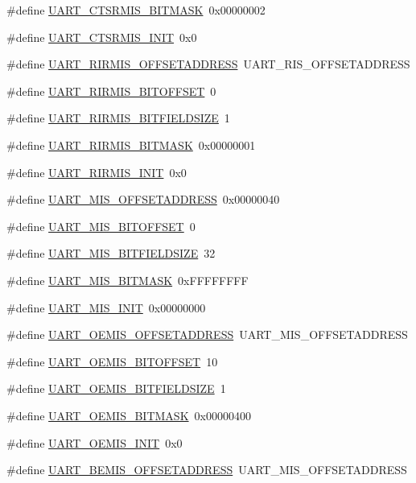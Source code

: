 \begin{DoxyCompactItemize}
\item 
\#define \hyperlink{a00575_a532a9a9b8c5334d87daa965c02495421}{UART\_\-CTSRMIS\_\-BITMASK}~0x00000002
\item 
\#define \hyperlink{a00575_acf809f477601ed3d7508458ef2de60fb}{UART\_\-CTSRMIS\_\-INIT}~0x0
\item 
\#define \hyperlink{a00575_a548ebc26f5fa42b536e65a2a01d9463d}{UART\_\-RIRMIS\_\-OFFSETADDRESS}~UART\_\-RIS\_\-OFFSETADDRESS
\item 
\#define \hyperlink{a00575_ac9c1d0ccde6ac054addb73f80c68958d}{UART\_\-RIRMIS\_\-BITOFFSET}~0
\item 
\#define \hyperlink{a00575_a3ecc630eb2fb9ac2a17c062d6edb2c39}{UART\_\-RIRMIS\_\-BITFIELDSIZE}~1
\item 
\#define \hyperlink{a00575_a7ee397a94f9a55592a64dfae9a60e793}{UART\_\-RIRMIS\_\-BITMASK}~0x00000001
\item 
\#define \hyperlink{a00575_a1df17599d2535f670e4687b68ee18aaa}{UART\_\-RIRMIS\_\-INIT}~0x0
\item 
\#define \hyperlink{a00575_a114f9a612f68d2d99e26642631dc2dd1}{UART\_\-MIS\_\-OFFSETADDRESS}~0x00000040
\item 
\#define \hyperlink{a00575_a87021cfe2ace821928fc6ecaf431a55d}{UART\_\-MIS\_\-BITOFFSET}~0
\item 
\#define \hyperlink{a00575_aa222440139eb174738c8e8db38defea6}{UART\_\-MIS\_\-BITFIELDSIZE}~32
\item 
\#define \hyperlink{a00575_ae59797bd011d4ecf8f938bc14643f8eb}{UART\_\-MIS\_\-BITMASK}~0xFFFFFFFF
\item 
\#define \hyperlink{a00575_aa8eebc2ba4a7f92119466ac11543b6ad}{UART\_\-MIS\_\-INIT}~0x00000000
\item 
\#define \hyperlink{a00575_a2537e9333bb58d4754b6789d260b9058}{UART\_\-OEMIS\_\-OFFSETADDRESS}~UART\_\-MIS\_\-OFFSETADDRESS
\item 
\#define \hyperlink{a00575_a868743cc2520e2ce9df53c3071cf894a}{UART\_\-OEMIS\_\-BITOFFSET}~10
\item 
\#define \hyperlink{a00575_a2fb4eea13b23d656e1e64aedc6049573}{UART\_\-OEMIS\_\-BITFIELDSIZE}~1
\item 
\#define \hyperlink{a00575_a47929196fa1c1746a06811b8783c818a}{UART\_\-OEMIS\_\-BITMASK}~0x00000400
\item 
\#define \hyperlink{a00575_a782c74d367c6c4e69a5c211297d2ea21}{UART\_\-OEMIS\_\-INIT}~0x0
\item 
\#define \hyperlink{a00575_aeedea630547eacc7004bb090116fc952}{UART\_\-BEMIS\_\-OFFSETADDRESS}~UART\_\-MIS\_\-OFFSETADDRESS

\end{DoxyCompactItemize}
